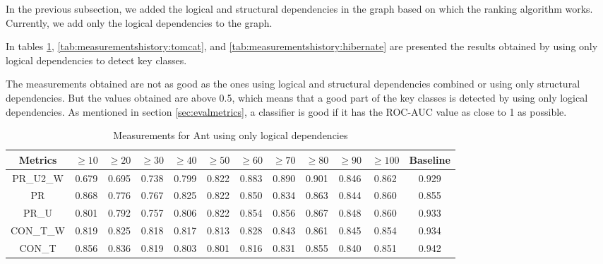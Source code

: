 \documentclass[runningheads]{comsis2}
\begin{document}
In the previous subsection, we added the logical and structural dependencies in the graph based on which the ranking algorithm works. Currently, we add only the logical dependencies to the graph.

In tables \ref{tab:measurementshistory:ant}, \ref{tab:measurementshistory:tomcat}, and \ref{tab:measurementshistory:hibernate} are presented the results obtained by using only logical dependencies to detect key classes.

The measurements obtained are not as good as the ones using logical and structural dependencies combined or using only structural dependencies. But the values obtained are above 0.5, which means that a good part of the key classes is detected by using only logical dependencies. As mentioned in section \ref{sec:evalmetrics}, a classifier is good if it has the ROC-AUC value as close to 1 as possible.


\begin{table}[!h]
\setlength\tabcolsep{3.5pt}
\caption{Measurements for Ant using only logical dependencies}
\label{tab:measurementshistory:ant}
\centering
\begin{tabular}{|c|cccccccccc|c|}
\hline
Metrics &	$\geq10$	&	$\geq20$		&	$\geq30$		&	$\geq40$		&	$\geq50$		&	$\geq60$		&	$\geq70$		&	$\geq80$		&	$\geq90$		&	$\geq100$		&	Baseline \\
\hline

PR\_U2\_W	&	0.679	&	0.695	&	0.738	&	0.799	&	0.822	&	0.883	&	0.890	&	0.901	&	0.846	&	0.862	&	0.929	\\
PR	&	0.868	&	0.776	&	0.767	&	0.825	&	0.822	&	0.850	&	0.834	&	0.863	&	0.844	&	0.860	&	0.855	\\
PR\_U	&	0.801	&	0.792	&	0.757	&	0.806	&	0.822	&	0.854	&	0.856	&	0.867	&	0.848	&	0.860	&	0.933	\\
CON\_T\_W	&	0.819	&	0.825	&	0.818	&	0.817	&	0.813	&	0.828	&	0.843	&	0.861	&	0.845	&	0.854	&	0.934	\\
CON\_T	&	0.856	&	0.836	&	0.819	&	0.803	&	0.801	&	0.816	&	0.831	&	0.855	&	0.840	&	0.851	&	0.942	\\


\hline
\end{tabular}
\end{table}
\end{document}
